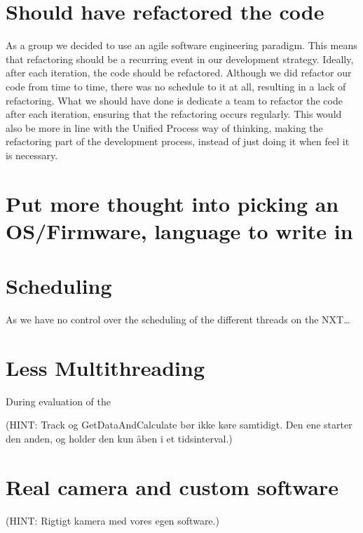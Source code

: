 \section{Should have refactored the code}
As a group we decided to use an agile software engineering paradigm. This means that
refactoring should be a recurring event in our development strategy. Ideally, after each iteration, the code should be refactored. Although we did refactor our code from time to time, there was no schedule to it at all, resulting in a lack of refactoring. What we should have done is dedicate a team to refactor the code after each iteration, ensuring that the refactoring occurs regularly. This would also be more in line with the Unified Process way of thinking, making the refactoring part of the development process, instead of just doing it when feel it is necessary.

\section{Put more thought into picking an OS/Firmware, language to write in}

\section{Scheduling}
As we have no control over the scheduling of the different threads on the NXT\ldots

\section{Less Multithreading}
During evaluation of the

(HINT: Track og GetDataAndCalculate bør ikke køre samtidigt. Den ene starter
  den anden, og holder den kun åben i et tidsinterval.)

\section{Real camera and custom software}
(HINT: Rigtigt kamera med vores egen software.)
